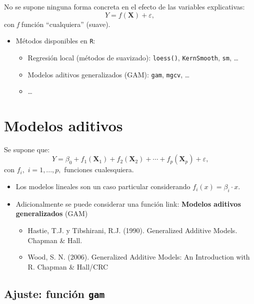\documentclass[
]{book}
\theoremstyle{break}
\theoremstyle{nonumberplain}
\begin{document}
No se supone ninguna forma concreta en el efecto de las variables explicativas:
\[Y=f\left(  \mathbf{X}\right)  +\varepsilon,\]
con \emph{f} función ``cualquiera'' (suave).

\begin{itemize}
\item
  Métodos disponibles en \texttt{R}:

  \begin{itemize}
  \item
    Regresión local (métodos de suavizado): \texttt{loess()}, \texttt{KernSmooth}, \texttt{sm}, \ldots{}
  \item
    Modelos aditivos generalizados (GAM): \texttt{gam}, \texttt{mgcv}, \ldots{}
  \item
    \ldots{}
  \end{itemize}
\end{itemize}

\hypertarget{modelos-aditivos}{%
\section{Modelos aditivos}\label{modelos-aditivos}}

Se supone que:
\[Y=\beta_{0}+f_{1}\left(  \mathbf{X}_{1}\right)  +f_{2}\left(  \mathbf{X}_{2}\right)  +\cdots+f_{p}\left(  \mathbf{X}_{p}\right)  +\varepsilon\text{,}\]
con \(f_{i},\) \(i=1,...,p,\) funciones cualesquiera.

\begin{itemize}
\item
  Los modelos lineales son un caso particular considerando \(f_{i}(x) = \beta_{i}·x\).
\item
  Adicionalmente se puede considerar una función link: \textbf{Modelos aditivos generalizados} (GAM)

  \begin{itemize}
  \item
    Hastie, T.J. y Tibshirani, R.J. (1990). Generalized Additive Models. Chapman \& Hall.
  \item
    Wood, S. N. (2006). Generalized Additive Models: An Introduction with R. Chapman \& Hall/CRC
  \end{itemize}
\end{itemize}

\hypertarget{ajuste-funciuxf3n-gam}{%
\subsection{\texorpdfstring{Ajuste: función \texttt{gam}}{Ajuste: función gam}}\label{ajuste-funciuxf3n-gam}}
\end{document}
